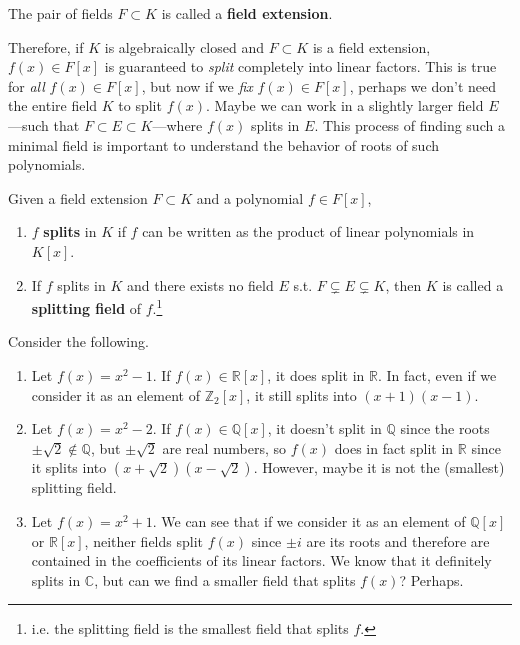   \begin{definition}
    The pair of fields $F \subset K$ is called a \textbf{field extension}. 
  \end{definition}

  Therefore, if $K$ is algebraically closed and $F \subset K$ is a field extension, $f(x) \in F[x]$ is guaranteed to \textit{split} completely into linear factors. This is true for \textit{all} $f(x) \in F[x]$, but now if we \textit{fix} $f(x) \in F[x]$, perhaps we don't need the entire field $K$ to split $f(x)$. Maybe we can work in a slightly larger field $E$---such that $F \subset E \subset K$---where $f(x)$ splits in $E$. This process of finding such a minimal field is important to understand the behavior of roots of such polynomials. 

  \begin{definition}
    Given a field extension $F \subset K$ and a polynomial $f \in F[x]$, 
    \begin{enumerate}
      \item $f$ \textbf{splits} in $K$ if $f$ can be written as the product of linear polynomials in $K[x]$. 
      \item If $f$ splits in $K$ and there exists no field $E$ s.t. $F \subsetneq E \subsetneq K$, then $K$ is called a \textbf{splitting field} of $f$.\footnote{i.e. the splitting field is the smallest field that splits $f$.} 
    \end{enumerate}
  \end{definition}

  \begin{example}
    Consider the following. 
    \begin{enumerate}
      \item Let $f(x) = x^2 - 1$. If $f(x) \in \mathbb{R}[x]$, it does split in $\mathbb{R}$. In fact, even if we consider it as an element of $\mathbb{Z}_2 [x]$, it still splits into $(x + 1)(x - 1)$. 
      \item Let $f(x) = x^2 - 2$. If $f(x) \in \mathbb{Q}[x]$, it doesn't split in $\mathbb{Q}$ since the roots $\pm \sqrt{2} \not\in \mathbb{Q}$, but $\pm \sqrt{2}$ are real numbers, so $f(x)$ does in fact split in $\mathbb{R}$ since it splits into $(x + \sqrt{2}) (x - \sqrt{2})$. However, maybe it is not the (smallest) splitting field. 
      \item Let $f(x) = x^2 + 1$. We can see that if we consider it as an element of $\mathbb{Q}[x]$ or $\mathbb{R}[x]$, neither fields split $f(x)$ since $\pm i$ are its roots and therefore are contained in the coefficients of its linear factors. We know that it definitely splits in $\mathbb{C}$, but can we find a smaller field that splits $f(x)$? Perhaps.  
    \end{enumerate}
  \end{example}

